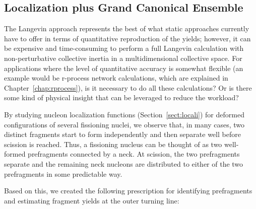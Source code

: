 \subsection{Localization plus Grand Canonical Ensemble}\label{sect:loc-frags}
The Langevin approach represents the best of what static approaches currently have to offer in terms of quantitative reproduction of the yields; however, it can be expensive and time-consuming to perform a full Langevin calculation with non-perturbative collective inertia in a multidimensional collective space. For applications where the level of quantitative accuracy is somewhat flexible (an example would be r-process network calculations, which are explained in Chapter~\ref{chap:rprocess}), is it necessary to do all these calculations? Or is there some kind of physical insight that can be leveraged to reduce the workload?

By studying nucleon localization functions (Section~\ref{sect:locali}) for deformed configurations of several fissioning nuclei, we observe that, in many cases, two distinct fragments start to form independently and then separate well before scission is reached. Thus, a fissioning nucleus can be thought of as two well-formed prefragments connected by a neck. At scission, the two prefragments separate and the remaining neck nucleons are distributed to either of the two prefragments in some predictable way.

Based on this, we created the following prescription for identifying prefragments and estimating fragment yields at the outer turning line:

